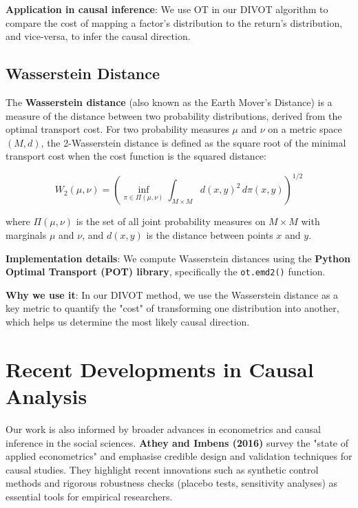 \textbf{Application in causal inference}: We use OT in our DIVOT algorithm to compare the cost of mapping a factor's distribution to the return's distribution, and vice-versa, to infer the causal direction.

\subsection*{Wasserstein Distance}
The \textbf{Wasserstein distance} (also known as the Earth Mover's Distance) is a measure of the distance between two probability distributions, derived from the optimal transport cost. For two probability measures $\mu$ and $\nu$ on a metric space $(M, d)$, the 2-Wasserstein distance is defined as the square root of the minimal transport cost when the cost function is the squared distance:

\[
W_2(\mu, \nu) = \left(\inf_{\pi \in \Pi(\mu, \nu)} \int_{M \times M} d(x, y)^2 \, d\pi(x, y)\right)^{1/2}
\]

where $\Pi(\mu, \nu)$ is the set of all joint probability measures on $M \times M$ with marginals $\mu$ and $\nu$, and $d(x, y)$ is the distance between points $x$ and $y$.

\textbf{Implementation details}: We compute Wasserstein distances using the \textbf{Python Optimal Transport (POT) library}\cite{Flamary21}, specifically the \texttt{ot.emd2()} function.

\textbf{Why we use it}: In our DIVOT method, we use the Wasserstein distance as a key metric to quantify the "cost" of transforming one distribution into another, which helps us determine the most likely causal direction.

\section{Recent Developments in Causal Analysis}
Our work is also informed by broader advances in econometrics and causal inference in the social sciences. \textbf{Athey and Imbens (2016)} survey the "state of applied econometrics" and emphasise credible design and validation techniques for causal studies\cite{Athey16}. They highlight recent innovations such as synthetic control methods and rigorous robustness checks (placebo tests, sensitivity analyses) as essential tools for empirical researchers.

